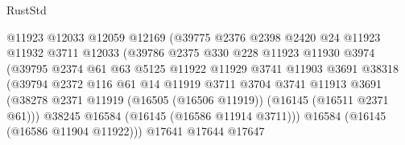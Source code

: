 \begin{lexlean}{RustStd}
\begin{coremodule}
                                  @11923
                                  @12033
                                  @12059
                                  @12169
                                  (@39775
                                    @2376
                                    @2398
                                    @2420
                                    @24
                                    @11923
                                    @11932
                                    @3711
                                    @12033
                                    (@39786
                                      @2375
                                      @330
                                      @228
                                      @11923
                                      @11930
                                      @3974
                                      (@39795
                                        @2374
                                        @61
                                        @63
                                        @5125
                                        @11922
                                        @11929
                                        @3741
                                        @11903
                                        @3691
                                        @38318
                                        (@39794
                                          @2372
                                          @116
                                          @61
                                          @14
                                          @11919
                                          @3711
                                          @3704
                                          @3741
                                          @11913
                                          @3691
                                          (@38278
                                            @2371
                                            @11919
                                            (@16505 (@16506 @11919))
                                            (@16145 (@16511 @2371 @61)))
                                          @38245
                                          @16584
                                          (@16145 (@16586 @11914 @3711)))
                                        @16584
                                        (@16145 (@16586 @11904 @11922)))
                                      @17641
                                      @17644
                                      @17647

\end{coremodule}
\end{lexlean}
